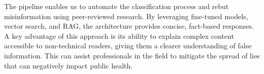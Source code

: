 The pipeline enables us to automate the classification process and rebut misinformation using peer-reviewed research. By leveraging fine-tuned models, vector search, and RAG, the architecture provides concise, fact-based responses. A key advantage of this
approach is its ability to explain complex content accessible to non-technical readers, giving them a clearer understanding of false information. This can assist professionals in the field to mitigate the spread of lies that can negatively impact public health.


%
%
%
%
%







